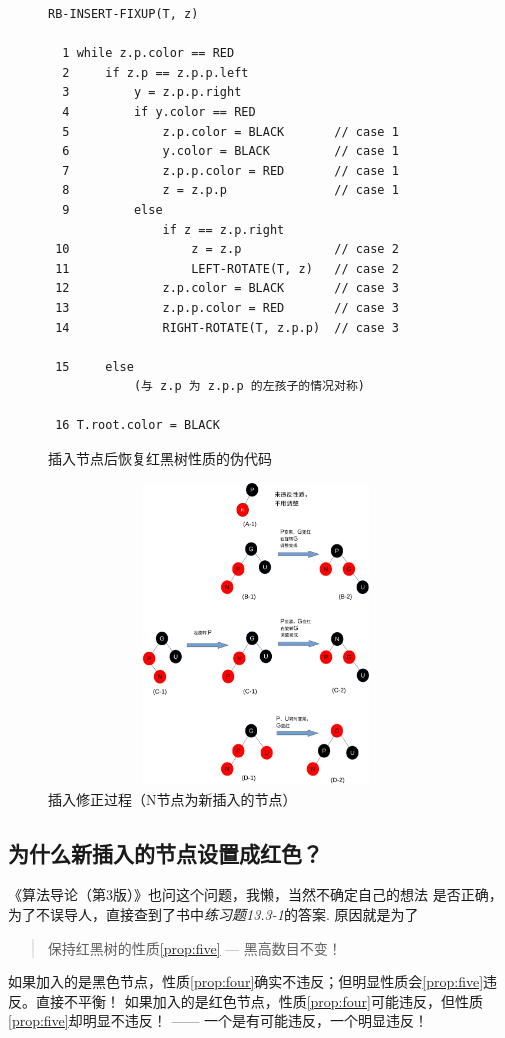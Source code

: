 \documentclass[a4paper, 11pt]{article}
\begin{document}
\begin{figure}[h]

\begin{verbatim}
RB-INSERT-FIXUP(T, z)

  1 while z.p.color == RED
  2     if z.p == z.p.p.left
  3         y = z.p.p.right
  4         if y.color == RED
  5             z.p.color = BLACK       // case 1
  6             y.color = BLACK         // case 1
  7             z.p.p.color = RED       // case 1
  8             z = z.p.p               // case 1
  9         else
                if z == z.p.right
 10                 z = z.p             // case 2            
 11                 LEFT-ROTATE(T, z)   // case 2
 12             z.p.color = BLACK       // case 3
 13             z.p.p.color = RED       // case 3
 14             RIGHT-ROTATE(T, z.p.p)  // case 3

 15     else  
            (与 z.p 为 z.p.p 的左孩子的情况对称)

 16 T.root.color = BLACK

\end{verbatim}

\caption{插入节点后恢复红黑树性质的伪代码}
\end{figure}

\begin{figure}[h]
	\centering
	\includegraphics[width=11cm, height=8cm]{images/insert_fixup.png}
	\caption{插入修正过程（N节点为新插入的节点）}
	\label{fig:insert:fixup}
\end{figure}

\subsection{为什么新插入的节点设置成红色？}
《算法导论（第3版）》\cite{algorithm:intro}也问这个问题，我懒，当然不确定自己的想法
是否正确，为了不误导人，直接查到了书中\emph{练习题13.3-1}的答案\cite{book:solution}.
原因就是为了\begin{quote}保持红黑树的性质\ref{prop:five} --- 黑高数目不变！\end{quote}
如果加入的是黑色节点，性质\ref{prop:four}确实不违反；但明显性质会\ref{prop:five}违反。直接不平衡！
如果加入的是红色节点，性质\ref{prop:four}可能违反，但性质\ref{prop:five}却明显不违反！
------ 一个是有可能违反，一个明显违反！
\end{document}
